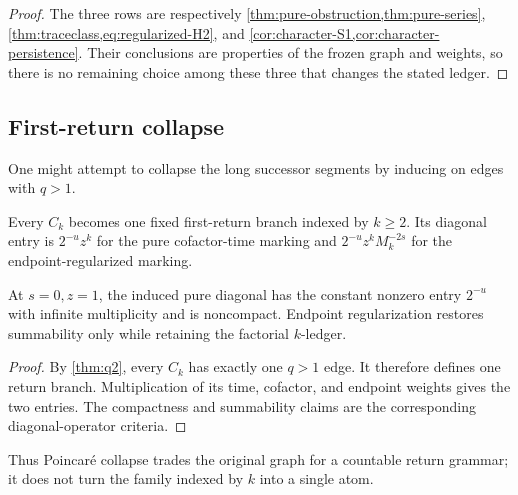 \begin{proof}
The three rows are respectively
\cref{thm:pure-obstruction,thm:pure-series},
\cref{thm:traceclass,eq:regularized-H2}, and
\cref{cor:character-S1,cor:character-persistence}.  Their conclusions are
properties of the frozen graph and weights, so there is no remaining choice
among these three that changes the stated ledger.
\end{proof}

\subsection{First-return collapse}

One might attempt to collapse the long successor segments by inducing on
edges with \(q>1\).

\begin{proposition}
\label{prop:return}
Every \(C_k\) becomes one fixed first-return branch indexed by \(k\ge2\).
Its diagonal entry is \(2^{-u}z^k\) for the pure cofactor-time marking and
\(2^{-u}z^kM_k^{-2s}\) for the endpoint-regularized marking.

At \(s=0,z=1\), the induced pure diagonal has the constant nonzero entry
\(2^{-u}\) with infinite multiplicity and is noncompact.  Endpoint
regularization restores summability only while retaining the factorial
\(k\)-ledger.
\end{proposition}

\begin{proof}
By \cref{thm:q2}, every \(C_k\) has exactly one \(q>1\) edge.  It therefore
defines one return branch.  Multiplication of its time, cofactor, and endpoint
weights gives the two entries.  The compactness and summability claims are
the corresponding diagonal-operator criteria.
\end{proof}

Thus Poincaré collapse trades the original graph for a countable return
grammar; it does not turn the family indexed by \(k\) into a single atom.
